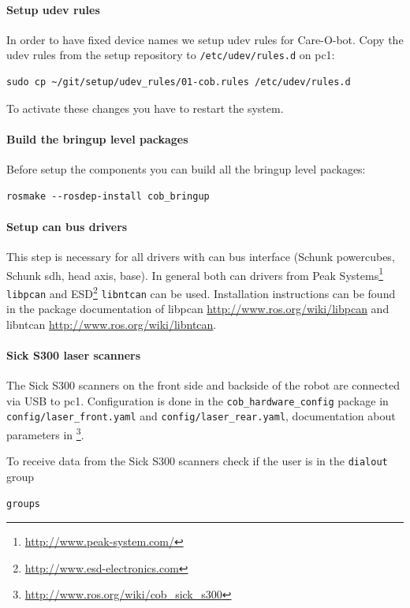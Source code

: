 \paragraph{Setup udev rules}
In order to have fixed device names we setup udev rules for Care-O-bot. Copy the udev rules from the setup repository to \texttt{/etc/udev/rules.d} on pc1:
\begin{lstlisting}
sudo cp ~/git/setup/udev_rules/01-cob.rules /etc/udev/rules.d
\end{lstlisting}
To activate these changes you have to restart the system.

\paragraph{Build the bringup level packages}
Before setup the components you can build all the bringup level packages:
\begin{lstlisting}
rosmake --rosdep-install cob_bringup
\end{lstlisting}

\paragraph{Setup can bus drivers}
This step is necessary for all drivers with can bus interface (Schunk powercubes, Schunk sdh, head axis, base). In general both can drivers from Peak Systems\footnote{\url{http://www.peak-system.com/}} \texttt{libpcan} and ESD\footnote{\url{http://www.esd-electronics.com}} \texttt{libntcan} can be used. Installation instructions can be found in the package documentation of libpcan \url{http://www.ros.org/wiki/libpcan} and libntcan \url{http://www.ros.org/wiki/libntcan}.

\paragraph{Sick S300 laser scanners}
The Sick S300 scanners on the front side and backside of the robot are connected via USB to pc1. Configuration is done in the \texttt{cob\_hardware\_config} package in \texttt{config/laser\_front.yaml} and \texttt{config/laser\_rear.yaml}, documentation about parameters in \footnote{\url{http://www.ros.org/wiki/cob_sick_s300}}.

To receive data from the Sick S300 scanners check if the user is in the \texttt{dialout} group
\begin{lstlisting}
groups
\end{lstlisting}

